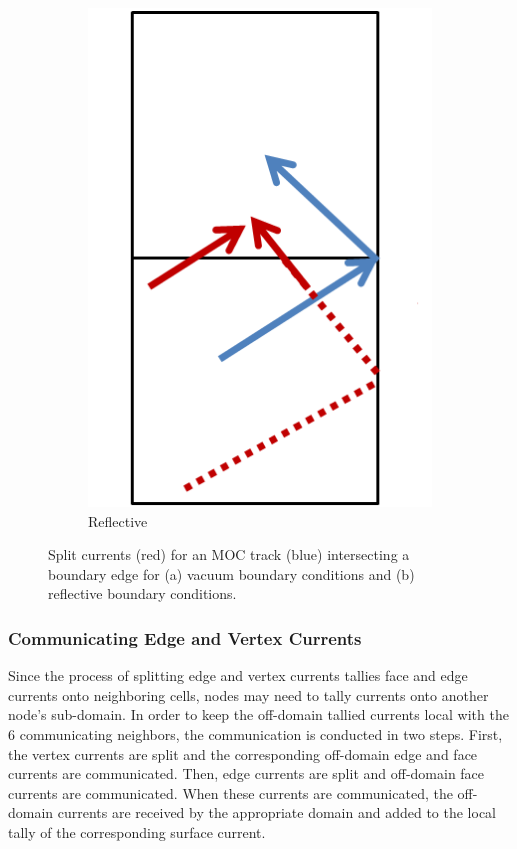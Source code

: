 \begin{figure}[h!]
\begin{subfigure}{0.45\textwidth}
		\includegraphics[width=\linewidth]{figures/DD/split-reflective.PNG}
		\caption{Reflective}
		\label{fig:split-reflective}
	\end{subfigure}
	\caption[]{Split currents (red) for an \ac{MOC} track (blue) intersecting a boundary edge for (a) vacuum boundary conditions and (b) reflective boundary conditions.}
	\label{fig:cmfd-split-current-boundary}
\end{figure}


\newpage
\subsubsection{Communicating Edge and Vertex Currents}

Since the process of splitting edge and vertex currents tallies face and edge currents onto neighboring cells, nodes may need to tally currents onto another node's sub-domain. In order to keep the off-domain tallied currents local with the 6 communicating neighbors, the communication is conducted in two steps. First, the vertex currents are split and the corresponding off-domain edge and face currents are communicated. Then, edge currents are split and off-domain face currents are communicated. When these currents are communicated, the off-domain currents are received by the appropriate domain and added to the local tally of the corresponding surface current.

